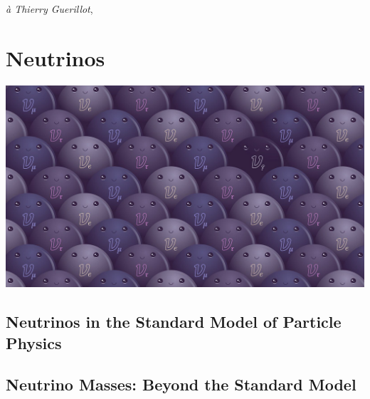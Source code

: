 \documentclass[11pt, twoside, a4paper, openright]{report}
\begin{document}
\graphicspath{{Figures/}}

\thispagestyle{empty}




\newpage
\thispagestyle{empty}

\mbox{}
\newpage



\vspace*{12pc}
\begin{flushright}
{\Large\textit{\`a Thierry Guerillot},}
\end{flushright}

\tableofcontents
\vskip 1cm



\setcounter{chapter}{0}
\chapter{Neutrinos}
{\color{purple}\titlerule[2.5pt]}
\vspace{4pc}%
\label{chap:neutrinos}
{\centering
\includegraphics[width=\textwidth]{sterile_header.png}}
\clearpage

	

	\section{Neutrinos in the Standard Model of Particle Physics}
	\label{sec:sm}
	

	\section{Neutrino Masses: Beyond the Standard Model}
	\label{sec:bsm}
	
\end{document}

